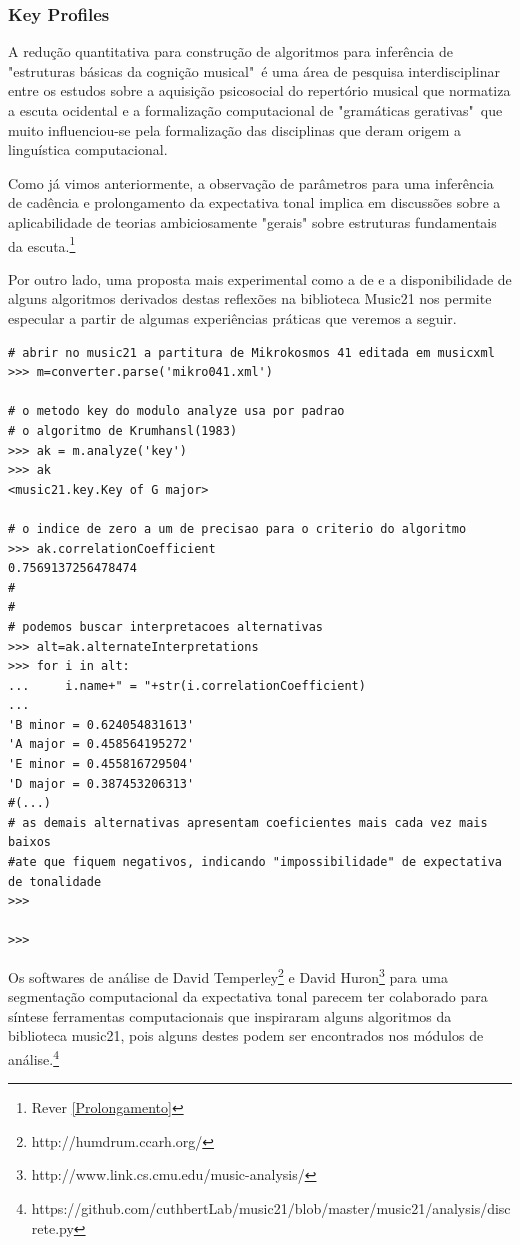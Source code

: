 \documentclass[
	12pt,				%
	openright,			%
	twoside,			%
	a4paper,			%
	english,			%
	french,				%
	spanish,			%
	brazil				%
	]{abntex2}
\begin{document}
\subsubsection{Key Profiles} 

A redução quantitativa para construção de algoritmos para inferência de "estruturas básicas da cognição musical"\cite{temperley2001cognition}\ é uma área de pesquisa interdisciplinar entre os estudos sobre a aquisição psicosocial do repertório musical que normatiza a escuta ocidental e a formalização computacional de "gramáticas gerativas"\cite[ p.83]{nierhaus2009algorithmic}\ que muito influenciou-se pela formalização das disciplinas que deram origem a linguística computacional.\cite{roads1979grammars}    

Como já vimos anteriormente, a observação de parâmetros para uma inferência de cadência e prolongamento da expectativa tonal implica em discussões sobre a aplicabilidade de teorias ambiciosamente "gerais" sobre estruturas fundamentais da escuta.\footnote{Rever \autoref{Prolongamento}  }

Por outro lado, uma proposta mais experimental como a de  e a disponibilidade de alguns algoritmos derivados destas reflexões na biblioteca Music21 nos permite especular a partir de algumas experiências práticas que veremos a seguir.


\begin{lstlisting}
# abrir no music21 a partitura de Mikrokosmos 41 editada em musicxml
>>> m=converter.parse('mikro041.xml')

# o metodo key do modulo analyze usa por padrao
# o algoritmo de Krumhansl(1983)
>>> ak = m.analyze('key')
>>> ak
<music21.key.Key of G major>

# o indice de zero a um de precisao para o criterio do algoritmo
>>> ak.correlationCoefficient
0.7569137256478474
#
#
# podemos buscar interpretacoes alternativas
>>> alt=ak.alternateInterpretations
>>> for i in alt:
...     i.name+" = "+str(i.correlationCoefficient)
... 
'B minor = 0.624054831613'
'A major = 0.458564195272'
'E minor = 0.455816729504'
'D major = 0.387453206313'
#(...)
# as demais alternativas apresentam coeficientes mais cada vez mais baixos 
#ate que fiquem negativos, indicando "impossibilidade" de expectativa de tonalidade
>>> 

>>> 
\end{lstlisting}

Os softwares de análise de David Temperley\footnote{http://humdrum.ccarh.org/} e David Huron\footnote{http://www.link.cs.cmu.edu/music-analysis/}  para uma segmentação computacional da expectativa tonal parecem ter colaborado para síntese ferramentas computacionais que inspiraram alguns algoritmos da biblioteca music21, pois alguns destes podem ser encontrados nos módulos de análise.\footnote{https://github.com/cuthbertLab/music21/blob/master/music21/analysis/discrete.py}
\end{document}
